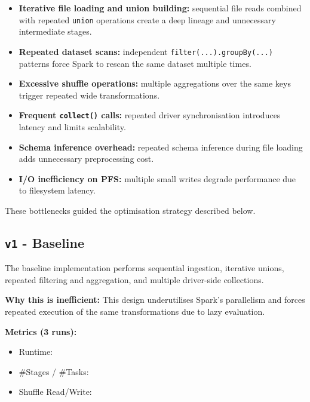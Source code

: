 \documentclass[conference,a4paper]{IEEEtran}
\begin{document}
\begin{itemize}
    \item \textbf{Iterative file loading and union building:} sequential file
    reads combined with repeated \texttt{union} operations create a deep
    lineage and unnecessary intermediate stages.

    \item \textbf{Repeated dataset scans:} independent
    \texttt{filter(...).groupBy(...)} patterns force Spark to rescan the same
    dataset multiple times.

    \item \textbf{Excessive shuffle operations:} multiple aggregations over the
    same keys trigger repeated wide transformations.

    \item \textbf{Frequent \texttt{collect()} calls:} repeated driver
    synchronisation introduces latency and limits scalability.

    \item \textbf{Schema inference overhead:} repeated schema inference during
    file loading adds unnecessary preprocessing cost.

    \item \textbf{I/O inefficiency on PFS:} multiple small writes degrade
    performance due to filesystem latency.
\end{itemize}

These bottlenecks guided the optimisation strategy described below.

\subsection{\texttt{v1} - Baseline}
\label{sec:v1}

The baseline implementation performs sequential ingestion, iterative unions,
repeated filtering and aggregation, and multiple driver-side collections.

\textbf{Why this is inefficient:}
This design underutilises Spark’s parallelism and forces repeated execution of
the same transformations due to lazy evaluation.

\textbf{Metrics (3 runs):}
\begin{itemize}
    \item Runtime: \texttt{}
    \item \#Stages / \#Tasks: \texttt{}
    \item Shuffle Read/Write: \texttt{}
\end{itemize}
\end{document}
